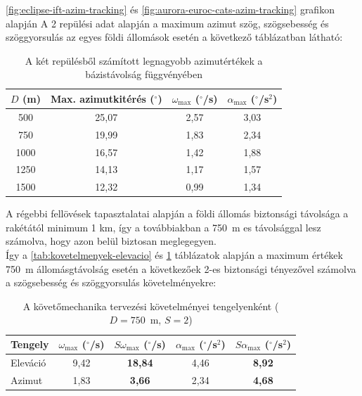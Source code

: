 \ref{fig:eclipse-ift-azim-tracking} és \ref{fig:aurora-euroc-cats-azim-tracking} grafikon alapján
A 2 repülési adat alapján a maximum azimut szög, szögsebesség és szöggyorsulás az egyes
földi állomások esetén a következő táblázatban látható:
\begin{table}[H]
    \centering
    \caption{A két repülésből számított legnagyobb azimutértékek a bázistávolság függvényében}
    \label{tab:kovetelmenyek-azimut}
    \renewcommand{\arraystretch}{1.2}
    \begin{tabular}{|c|c|c|c|}
        \hline
        \rowcolor{blue!15}
        \textbf{$D$ (m)} & \textbf{Max. azimutkitérés ($^\circ$)} & $\omega_{\max}$ ($^\circ$/s) & $\alpha_{\max}$ ($^\circ$/s$^2$) \\
        \hline
        500 & 25,07 & 2,57 & 3,03 \\
        \hline
        750 & 19,99 & 1,83 & 2,34 \\
        \hline
        1000 & 16,57 & 1,42 & 1,88 \\
        \hline
        1250 & 14,13 & 1,17 & 1,57 \\
        \hline
        1500 & 12,32 & 0,99 & 1,34 \\
        \hline
    \end{tabular}
\end{table}

A régebbi fellövések tapasztalatai alapján a földi állomás biztonsági távolsága
a rakétától minimum 1 km, így a továbbiakban a 750~m es távolsággal lesz számolva, hogy
azon belül biztosan meglegegyen. \\

Így a \ref{tab:kovetelmenyek-elevacio} és \ref{tab:kovetelmenyek-azimut} táblázatok alapján a
maximum értékek 750~m állomásgtávolság esetén a következőek 2-es biztonsági tényezővel számolva
a szögsebesség és szöggyorsulás követelményekre:

\begin{table}[H]
    \centering
    \caption{A követőmechanika tervezési követelményei tengelyenként ($D = 750$~m, $S = 2$)}
    \label{tab:tervezesi-kovetelmenyek-750m}
    \renewcommand{\arraystretch}{1.2}
    \begin{tabular}{|l|c|c|c|c|}
        \hline
        \rowcolor{blue!15}
        \textbf{Tengely} & $\omega_{\max}$ ($^\circ$/s) & $S\omega_{\max}$ ($^\circ$/s) & $\alpha_{\max}$ ($^\circ$/s$^2$) & $S\alpha_{\max}$ ($^\circ$/s$^2$) \\
        \hline
        Eleváció & 9,42 & \textbf{18,84} & 4,46 & \textbf{8,92} \\
        \hline
        Azimut & 1,83 & \textbf{3,66} & 2,34 & \textbf{4,68} \\
        \hline
    \end{tabular}
\end{table}

